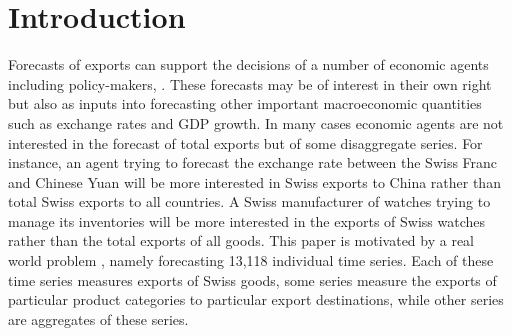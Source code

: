 \documentclass[a4paper,fleqn,11pt]{article}
\begin{document}
			




\section{Introduction}
\label{sec:intro}
Forecasts of exports can support the decisions of a number of economic agents including policy-makers, .  These forecasts may be of interest in their own right but also as inputs into forecasting other important macroeconomic quantities such as exchange rates and GDP growth.  In many cases economic agents are not interested in the forecast of total exports but of some disaggregate series.  For instance, an agent trying to forecast the exchange rate between the Swiss Franc and Chinese Yuan will be more interested in Swiss exports to China rather than total Swiss exports to all countries.  A Swiss manufacturer of watches trying to manage its inventories will be more interested in the exports of Swiss watches rather than the total exports of all goods.  This paper is motivated by a real world problem , namely forecasting 13,118 individual time series. Each of these time series measures exports of Swiss goods, some series measure the exports of particular product categories to particular export destinations, while other series are aggregates of these series.
\end{document}
